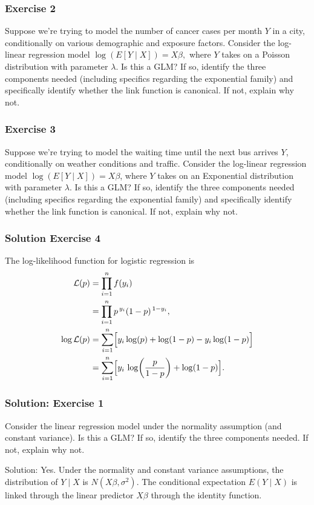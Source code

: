 \documentclass{beamer}
\begin{document}
\begin{frame}
\frametitle{Exercise 2}

Suppose we’re trying to model the number of cancer cases per month $Y$ in a city, conditionally on various demographic and exposure factors. Consider the log-linear regression model $\log (E[Y \mid X]) = X\beta,$ where $Y$ takes on a Poisson distribution with parameter  $\lambda.$ Is this a GLM? If so, identify the three components needed (including specifics regarding the exponential family) and specifically identify whether the link function is canonical. If not, explain why not.
\end{frame}

\begin{frame}
\frametitle{Exercise 3}

Suppose we’re trying to model the waiting time until the next bus arrives $Y$, conditionally on weather conditions and traffic. Consider the log-linear regression model $\log (E[Y \mid X]) = X\beta$, where $Y$ takes on an Exponential distribution with parameter $\lambda$. Is this a GLM? If so, identify the three components needed (including specifics regarding the exponential family) and specifically identify whether the link function is canonical. If not, explain why not.

\end{frame}

\begin{frame}
\frametitle{Solution Exercise 4}

The log-likelihood function for logistic regression is
\[
\begin{aligned}
\mathcal{L}(p) &= \prod_{i=1}^n f(y_i) \\
&= \prod_{i=1}^n p^{\,y_i}(1-p)^{\,1-y_i}, \\
\log\mathcal{L}(p) &= \sum_{i=1}^n \Bigl[ y_i\log(p) + \log(1-p) - y_i\log(1-p) \Bigr] \\
&= \sum_{i=1}^n \Bigl[ y_i\,\log\!\left(\frac{p}{1-p}\right) + \log(1-p) \Bigr].
\end{aligned}
\]

\end{frame}

\begin{frame}
\frametitle{Solution: Exercise 1}

Consider the linear regression model under the normality assumption (and constant variance). Is this a GLM? If so, identify the three components needed. If not, explain why not.

\vspace*{1em}

Solution: Yes. Under the normality and constant variance assumptions, the distribution of $Y \mid X$ is $N(X\beta, \sigma^2).$ The conditional expectation $E(Y \mid X)$ is linked through the linear predictor $X\beta$ through the identity function. 
\end{frame}
\end{document}
